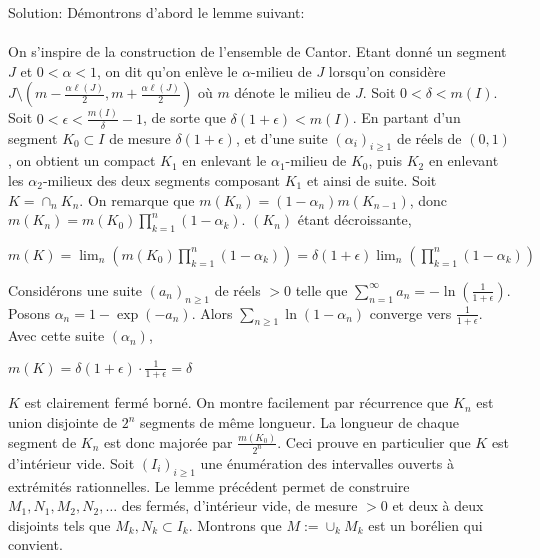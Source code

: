 \documentclass{report}
\begin{document}
Solution: Démontrons d'abord le lemme suivant: \newline \newline
{} \\ \\
On s'inspire de la construction de l'ensemble de Cantor. \newline
Etant donné un segment $J$ et $0<\alpha<1$, on dit qu'on enlève le $\alpha$-milieu de $J$ lorsqu'on considère $J\setminus (m- \frac{\alpha\ell(J)}2, m+ \frac{\alpha\ell(J)}2)$ où $m$ dénote le milieu de $J$. \newline
Soit $0<\delta < m(I)$. \newline
Soit $0<\epsilon<\frac{m(I)}{\delta}-1$, de sorte que $\delta(1+\epsilon)<m(I)$. En partant d'un segment $K_0\subset I$ de mesure $\delta(1+\epsilon)$, et d'une suite $(\alpha_i)_{i\geq 1}$ de réels de $(0,1)$, on obtient un compact $K_1$ en enlevant le $\alpha_1$-milieu de $K_0$, puis $K_2$ en enlevant les $\alpha_2$-milieux des deux segments composant $K_1$ et ainsi de suite. Soit $K=\cap_n K_n$. On remarque que $m(K_n) = (1-\alpha_n)m(K_{n-1})$, donc $m(K_n) = m(K_0)\prod_{k=1}^n (1-\alpha_k)$. \newline
$(K_n)$ étant décroissante, \newline 
\centerline{$m(K) = \lim_n \left(m(K_0)\prod_{k=1}^n (1-\alpha_k)\right)=\delta(1+\epsilon) \lim_n \left(\prod_{k=1}^n (1-\alpha_k)\right)$} \newline \newline
Considérons une suite $(a_n)_{n\geq 1}$ de réels $>0$ telle que $\sum_{n=1}^\infty a_n = -\ln\left(\frac{1}{1+\epsilon}\right)$. Posons $\alpha_n=1-\exp(-a_n)$. Alors $\sum_{n\geq 1}\ln (1-\alpha_n)$ converge vers $\frac{1}{1+\epsilon}$. Avec cette suite $(\alpha_n)$, \newline 
 \centerline{$m(K) = \delta(1+\epsilon)\cdot\frac{1}{1+\epsilon}  = \delta$} \newline
 $K$ est clairement fermé borné. On montre facilement par récurrence que $K_n$ est union disjointe de $2^n$ segments de même longueur. La longueur de chaque segment de $K_n$ est donc majorée par $\frac{m(K_0)}{2^n}$. Ceci prouve en particulier que $K$ est d'intérieur vide. \newline
 \newline
 Soit $(I_i)_{i\geq 1}$ une énumération des intervalles ouverts à extrémités rationnelles. Le lemme précédent permet de construire $M_1,N_1,M_2,N_2,\ldots$ des fermés, d'intérieur vide, de mesure $>0$ et deux à deux disjoints tels que $M_k,N_k\subset I_k$. Montrons que $M:=\cup_k M_k$ est un borélien qui convient.\newline
\end{document}

